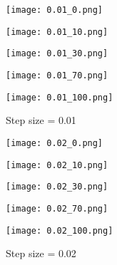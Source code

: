 \documentclass[12pt,a4paper]{article}
\theoremstyle{remark}
\begin{document}
\begin{enumerate}
    \begin{figure}
        \centering
        \begin{minipage}{0.48\textwidth}
            \centering
            \texttt{[image: 0.01\_0.png]}
            \caption*{$K = 0$}
        \end{minipage}
        \begin{minipage}{0.48\textwidth}
            \centering
            \texttt{[image: 0.01\_10.png]}
            \caption*{$K = 10$}
        \end{minipage}
        \begin{minipage}{0.48\textwidth}
            \centering
            \texttt{[image: 0.01\_30.png]}
            \caption*{$K = 30$}
        \end{minipage}
        \begin{minipage}{0.48\textwidth}
            \centering
            \texttt{[image: 0.01\_70.png]}
            \caption*{$K = 70$}
        \end{minipage}
        \begin{minipage}{0.4\textwidth}
            \centering
            \texttt{[image: 0.01\_100.png]}
            \caption*{$K = 100$}
        \end{minipage}
        \caption{Step size = 0.01}
        \label{fig:0.01}
    \end{figure}

    \begin{figure}
        \centering
        \begin{minipage}{0.48\textwidth}
            \centering
            \texttt{[image: 0.02\_0.png]}
            \caption*{$K = 0$}
        \end{minipage}
        \begin{minipage}{0.48\textwidth}
            \centering
            \texttt{[image: 0.02\_10.png]}
            \caption*{$K = 10$}
        \end{minipage}
        \begin{minipage}{0.48\textwidth}
            \centering
            \texttt{[image: 0.02\_30.png]}
            \caption*{$K = 30$}
        \end{minipage}
        \begin{minipage}{0.48\textwidth}
            \centering
            \texttt{[image: 0.02\_70.png]}
            \caption*{$K = 70$}
        \end{minipage}
        \begin{minipage}{0.4\textwidth}
            \centering
            \texttt{[image: 0.02\_100.png]}
            \caption*{$K = 100$}
        \end{minipage}
        \caption{Step size = 0.02}
        \label{fig:0.02}
    \end{figure}


\end{enumerate}
\end{document}
